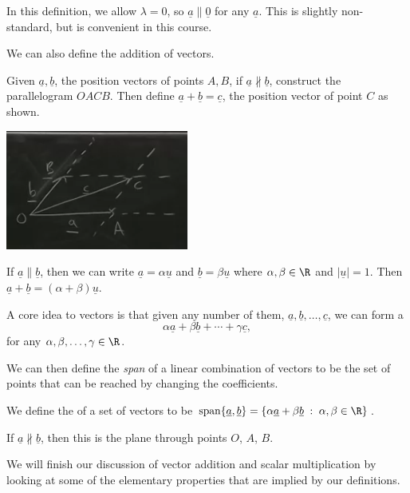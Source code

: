 \documentclass[a4]{scrartcl}
\begin{document}
In this definition, we allow $\lambda = 0$, so $\underline{a} \parallel \underline{0}$ for any $\underline{a}$. 
This is slightly non-standard, but is convenient in this course.

We can also define the addition of vectors.

\begin{definition}
	Given $\underline{a}, \underline{b}$, the position vectors of points $A, B$, if $\underline{a} \not\parallel \underline{b}$, construct the parallelogram $OACB$. Then define $\underline{a} + \underline{b} = \underline{c}$, the position vector of point $C$ as shown.
	\begin{center}
		\includegraphics[width=0.45\textwidth]{parallelogram.png}
	\end{center} 
	If $\underline{a} \parallel \underline{b}$, then we can write $\underline{a} = \alpha \underline{u}$ and $\underline{b} = \beta \underline{u}$ where $\alpha, \beta \in \R$ and $|\underline{u}| = 1$. Then $\underline{a} + \underline{b} = (\alpha + \beta) \underline{u}$.
\end{definition}

A core idea to vectors is that given any number of them, $\underline{a}, \underline{b}, \dots, \underline{c}$, we can form a 
$$
\alpha \underline{a} + \beta \underline{b} + \cdots + \gamma \underline{c},
$$
for any $\alpha, \beta, \dots, \gamma \in \R$.

We can then define the \emph{span} of a linear combination of vectors to be the set of points that can be reached by changing the coefficients.

\begin{definition}
	We define the  of a set of vectors to be $\operatorname{span} \{\underline{a}, \underline{b}\} = \{ \alpha \underline{a} + \beta \underline{b} \; : \; \alpha, \beta \in \R\}$.
\end{definition}
If $\underline{a} \not \parallel \underline{b}$, then this is the plane through points $O$, $A$, $B$.


We will finish our discussion of vector addition and scalar multiplication by looking at some of the elementary properties that are implied by our definitions.
\end{document}
